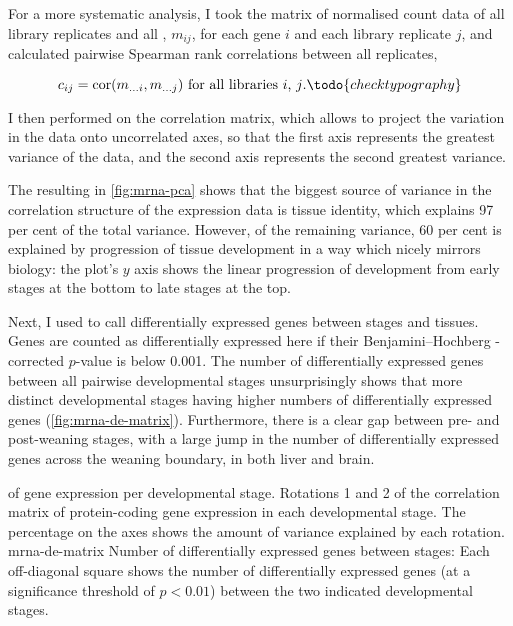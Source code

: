 For a more systematic analysis, I took the matrix of normalised count data of
all library replicates and all \mrna[s], \(m_{ij}\), for each \mrna gene \(i\)
and each library replicate \(j\), and calculated pairwise Spearman rank
correlations between all replicates,

\begin{equation}
    c_{ij} = \operatorname{cor}(m_{\dots i}, m_{\dots j}) \text{\ for all
        libraries \(i\), \(j\).}\todo{check typography}
\end{equation}

I then performed \pca on the correlation matrix, which allows to project the
variation in the data onto uncorrelated axes, so that the first axis represents
the greatest variance of the data, and the second axis represents the second
greatest variance.

The resulting \pca in \cref{fig:mrna-pca} shows that the biggest source of
variance in the correlation structure of the expression data is tissue identity,
which explains \num{97} per cent of the total variance. However, of the
remaining variance, \num{60} per cent is explained by progression of tissue
development in a way which nicely mirrors biology: the plot’s \(y\) axis shows
the linear progression of development from early stages at the bottom to late
stages at the top.

Next, I used  \citep{Love:2014} to call differentially expressed
genes between stages and tissues. Genes are counted as differentially expressed
here if their Benjamini–Hochberg \fdr-corrected \(p\)-value is below
\num{0.001}. The number of differentially expressed genes between all pairwise
developmental stages unsurprisingly shows that more distinct developmental
stages having higher numbers of differentially expressed genes
(\cref{fig:mrna-de-matrix}). Furthermore, there is a clear gap between pre- and
post-weaning stages, with a large jump in the number of differentially expressed
genes across the weaning boundary, in both liver and brain.

    {\pca of \mrna gene expression per developmental stage.}
    {Rotations \num{1} and \num{2} of the correlation matrix of
    protein-coding gene expression in each developmental stage. The percentage
    on the axes shows the amount of variance explained by each rotation.}
    {mrna-de-matrix}
    {Number of differentially expressed \mrna genes between stages:}
    {Each off-diagonal square shows the number of differentially
    expressed genes (at a significance threshold of \(p<0.01\)) between
    the two indicated developmental stages.}

